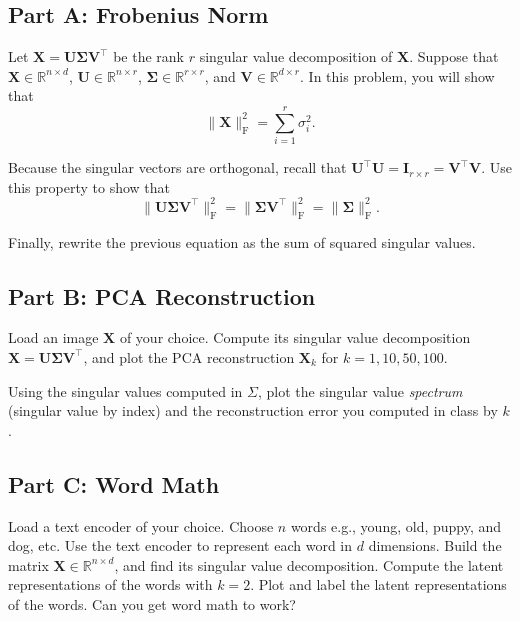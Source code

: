 \documentclass{article}
\begin{document}
\subsection*{Part A: Frobenius Norm}

Let $\mathbf{X} = \mathbf{U \Sigma V^\top}$ be the rank $r$ singular value decomposition of $\mathbf{X}$.
Suppose that
$\mathbf{X} \in \mathbb{R}^{n \times d}$,
$\mathbf{U} \in \mathbb{R}^{n \times r}$,
$\mathbf{\Sigma} \in \mathbb{R}^{r \times r}$, and
$\mathbf{V} \in \mathbb{R}^{d \times r}$.
In this problem, you will show that
$$
\| \mathbf{X} \|_\text{F}^2 = \sum_{i=1}^r \sigma_i^2.
$$

Because the singular vectors are orthogonal, recall that $\mathbf{U}^\top \mathbf{U} = \mathbf{I}_{r \times r} = \mathbf{V}^\top \mathbf{V}$.
Use this property to show that
$$
\| \mathbf{U \Sigma V^\top} \|_\text{F}^2 =
\| \mathbf{\Sigma V^\top} \|_\text{F}^2 =
\| \mathbf{\Sigma} \|_\text{F}^2.
$$

Finally, rewrite the previous equation as the sum of squared singular values.

\subsection*{Part B: PCA Reconstruction}

Load an image $\mathbf{X}$ of your choice.
Compute its singular value decomposition $\mathbf{X} = \mathbf{U \Sigma V^\top}$,
and plot the PCA reconstruction $\mathbf{X}_k$ for $k=1,10,50,100$.

Using the singular values computed in $\Sigma$, plot the singular value \textit{spectrum} (singular value by index) and the reconstruction error you computed in class by $k$.

\subsection*{Part C: Word Math}

Load a text encoder of your choice.
Choose $n$ words e.g., young, old, puppy, and dog, etc.
Use the text encoder to represent each word in $d$ dimensions.
Build the matrix $\mathbf{X} \in \mathbb{R}^{n \times d}$, and find its singular value decomposition.
Compute the latent representations of the words with $k=2$.
Plot and label the latent representations of the words.
Can you get word math to work?

%
\end{document}
